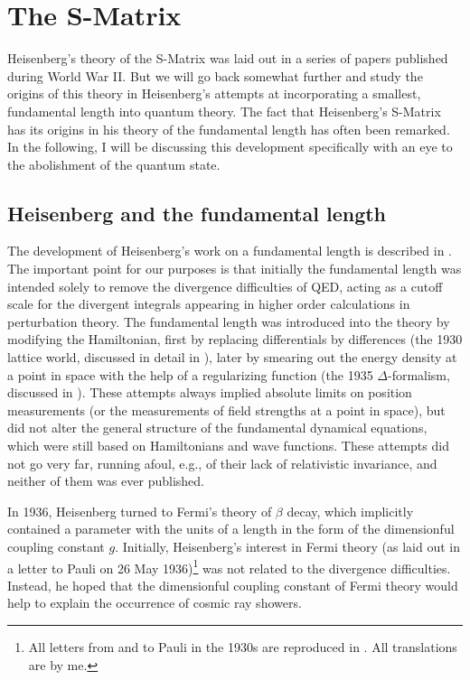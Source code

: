 \documentclass[12pt]{article}
\begin{document}
\section{The S-Matrix}

Heisenberg's theory of the S-Matrix was laid out in a series of papers published during World War II. But we will go back somewhat further and study the origins of this theory in Heisenberg's attempts at incorporating a smallest, fundamental length into quantum theory. The fact that Heisenberg's S-Matrix has its origins in his theory of the fundamental length has often been remarked. In the following, I will be discussing this development specifically with an eye to the abolishment of the quantum state.

\subsection{Heisenberg and the fundamental length}

The development of Heisenberg's work on a fundamental length is described in  \citep{kragh_1995_arthur}. The important point for our purposes is that initially the fundamental length was intended solely to remove the divergence difficulties of  QED, acting as a cutoff scale for the divergent integrals appearing in higher order calculations in perturbation theory. The fundamental length was introduced into the theory by modifying the Hamiltonian, first by replacing differentials by differences (the 1930 lattice world, discussed in detail in \citep{carazza_1995_heisenbergs}), later by smearing out the energy density at a point in space with the help of a regularizing function (the 1935 $\Delta$-formalism, discussed in \citep{miller_1994_early}). These attempts always implied absolute limits on position measurements (or the measurements of field strengths at a point in space), but did not alter the general structure of the fundamental dynamical equations, which were still based on Hamiltonians and wave functions. These attempts did not go very far, running afoul, e.g., of their lack of relativistic invariance, and neither of them was ever published.

In 1936, Heisenberg turned to Fermi's theory of $\beta$ decay, which implicitly contained a parameter with the units of a length in the form of the dimensionful coupling constant $g$. Initially, Heisenberg's interest in Fermi theory (as laid out in a letter to Pauli on 26 May 1936)\footnote{All letters from and to Pauli in the 1930s are reproduced in \citep{hermann_1985_wissenschaftlicher}. All translations are by me.} was not related to the divergence difficulties. Instead, he hoped that the dimensionful coupling constant of Fermi theory would help to explain the occurrence of cosmic ray showers. 
\end{document}
